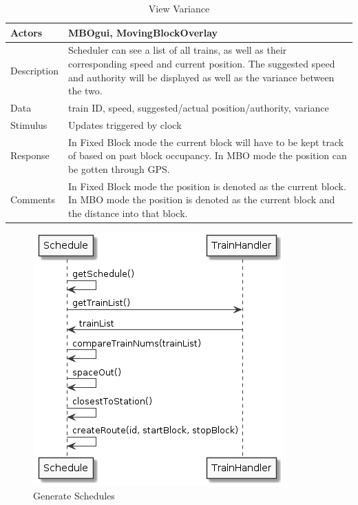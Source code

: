 \documentclass[]{article}
\begin{document}
	\begin{table}[H]
		\centering
		\caption{View Variance}
		\begin{tabular}{|l|l|}
			\hline
			Actors & \parbox[t]{10cm}{MBOgui, MovingBlockOverlay} \\ \hline
			Description & \parbox[t]{10cm}{Scheduler can see a list of all  trains, as well as their corresponding speed and current position. The suggested speed and authority will be displayed as well as the variance between the two.} \\ \hline
			Data &  \parbox[t]{10cm}{train ID, speed, suggested/actual position/authority, variance} \\ \hline
			Stimulus &  \parbox[t]{10cm}{Updates triggered by clock} \\ \hline
			Response & \parbox[t]{10cm}{In Fixed Block mode the current block will have to be kept track of based on past block occupancy. In MBO mode the position can be gotten through GPS.}\\ \hline
			Comments & \parbox[t]{10cm}{In Fixed Block mode the position is denoted as the current block. In MBO mode the position is denoted as the current block and the distance into that block.}  \\ \hline
		\end{tabular}
	\end{table}
	
	\begin{figure}[H]
		\centering
		\includegraphics{genSched.png}
		\caption{Generate Schedules}
	\end{figure}
	
\end{document}
